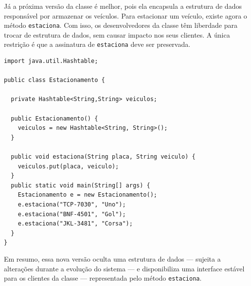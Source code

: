 \documentclass[
  11pt,
  twoside]{book}
\newcommand{\passthrough}[1]{#1}
\begin{document}
Já a próxima versão da classe é melhor, pois ela encapsula a estrutura
de dados responsável por armazenar os veículos. Para estacionar um
veículo, existe agora o método \passthrough{\lstinline!estaciona!}. Com
isso, os desenvolvedores da classe têm liberdade para trocar de
estrutura de dados, sem causar impacto nos seus clientes. A única
restrição é que a assinatura de \passthrough{\lstinline!estaciona!} deve
ser preservada.

\begin{lstlisting}
import java.util.Hashtable;

public class Estacionamento {

  private Hashtable<String,String> veiculos;

  public Estacionamento() {
    veiculos = new Hashtable<String, String>();
  }

  public void estaciona(String placa, String veiculo) {
    veiculos.put(placa, veiculo);
  }
  public static void main(String[] args) {
    Estacionamento e = new Estacionamento();
    e.estaciona("TCP-7030", "Uno");
    e.estaciona("BNF-4501", "Gol");
    e.estaciona("JKL-3481", "Corsa");
  }
}
\end{lstlisting}

Em resumo, essa nova versão oculta uma estrutura de dados --- sujeita a
alterações durante a evolução do sistema --- e disponibiliza uma
interface estável para os clientes da classe --- representada pelo
método \passthrough{\lstinline!estaciona!}.

 
\end{document}
